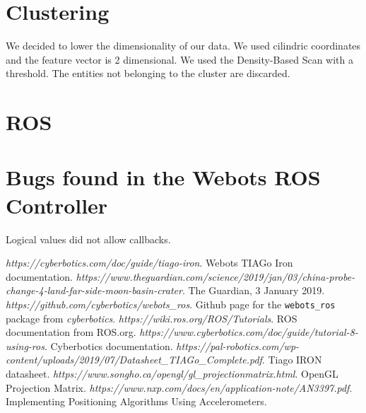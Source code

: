 \documentclass[a4paper]{article}
\begin{document}
	\section{Clustering}
	We decided to lower the dimensionality of our data. We used cilindric coordinates and the feature vector is 2 dimensional.
	We used the Density-Based Scan with a threshold. The entities not belonging to the cluster are discarded.
	
	\section{ROS}
	
	\section{Bugs found in the Webots ROS Controller}
	Logical values did not allow callbacks.
	

	
	
	\newpage
	
	\begin{thebibliography}{9}
		\textit{https://cyberbotics.com/doc/guide/tiago-iron}. \newline
		Webots TIAGo Iron documentation.
		\textit{https://www.theguardian.com/science/2019/jan/03/china-probe-change-4-land-far-side-moon-basin-crater}. \newline
		The Guardian, 3 January 2019.
		\textit{https://github.com/cyberbotics/webots\_ros}. \newline
		Github page for the \texttt{webots\_ros} package from \textit{cyberbotics}.
		\textit{https://wiki.ros.org/ROS/Tutorials}. \newline
		ROS documentation from ROS.org.
		\textit{https://www.cyberbotics.com/doc/guide/tutorial-8-using-ros}. \newline
		Cyberbotics documentation.
		\textit{https://pal-robotics.com/wp-content/uploads/2019/07/Datasheet\_TIAGo\_Complete.pdf}. \newline
		Tiago IRON datasheet.
		\textit{https://www.songho.ca/opengl/gl\_projectionmatrix.html}. \newline
		OpenGL Projection Matrix.
		\textit{https://www.nxp.com/docs/en/application-note/AN3397.pdf}. \newline
		Implementing Positioning Algorithms Using Accelerometers.
	\end{thebibliography}
\end{document}
